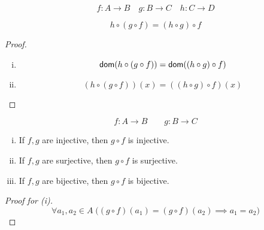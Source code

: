 \begin{frame}{}
  \begin{theorem}
    \[
      f: A \to B \quad g: B \to C \quad h: C \to D
    \]

    \[
      h \circ (g \circ f) = (h \circ g) \circ f
    \]
  \end{theorem}

  \pause
  \vspace{0.60cm}
  \begin{proof}
    \pause
    \begin{enumerate}[(i)]
      \item 
	\[
	  \textsf{dom}(h \circ (g \circ f)) = \textsf{dom}((h \circ g) \circ f)
	\]
      \item 
	\[
	  (h \circ (g \circ f))(x) = ((h \circ g) \circ f)(x)
	\]
    \end{enumerate}
  \end{proof}
\end{frame}

\begin{frame}{}
  \begin{theorem}
    \[
      f: A \to B \qquad g: B \to C
    \]

    \begin{enumerate}[(i)]
      \item If $f, g$ are injective, then $g \circ f$ is injective.
      \item If $f, g$ are surjective, then $g \circ f$ is surjective.
      \item If $f, g$ are bijective, then $g \circ f$ is bijective.
    \end{enumerate}
  \end{theorem}

  \pause
  \vspace{0.60cm}
  \begin{proof}[Proof for (i)]
    \pause
    \[
      \forall a_1, a_2 \in A\; \Big( (g \circ f)(a_1) = (g \circ f)(a_2) \implies a_1 = a_2 \Big)
    \]
  \end{proof}
\end{frame}

